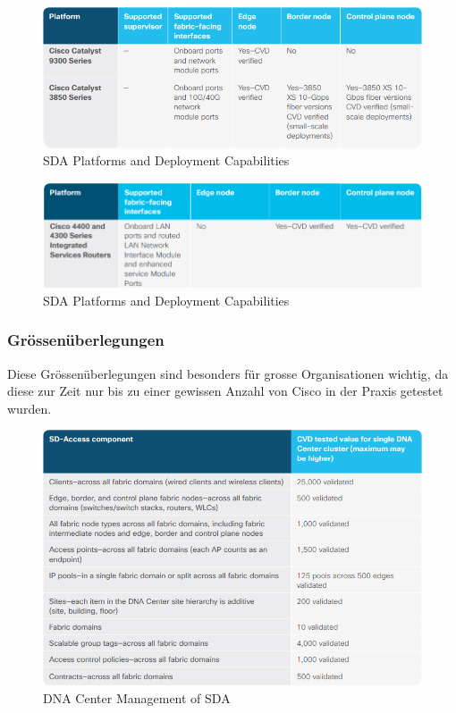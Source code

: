 \begin{figure}[H]
	\centering
	\includegraphics[width=0.8\linewidth]{img/Analyse/CVD-SDAswitchingplatformsanddeploymentcapabilities-1-2-5}
	\caption{SDA Platforms and Deployment Capabilities \cite{sda-designguide-sept2018}}
	\label{fig:SDA switching platforms and deployment capabilities}
\end{figure}

\begin{figure}[H]
	\centering
	\includegraphics[width=0.8\linewidth]{img/Analyse/CVD-SDAroutingandwirelessplatformsanddeploymentcapabilities-1-2-5}
	\caption{SDA Platforms and Deployment Capabilities \cite{sda-designguide-sept2018}}
	\label{fig:SDA routing and wireless platforms and deployment capabilities}
\end{figure}

\subsubsection{Grössenüberlegungen}
Diese Grössenüberlegungen sind besonders für grosse Organisationen wichtig, da diese zur Zeit nur bis zu einer gewissen Anzahl von Cisco in der Praxis getestet wurden.


\begin{figure}[H]
	\centering
	\includegraphics[width=0.8\linewidth]{img/Analyse/CVD-DNACmanagementofSDA-1-2-5}
	\caption{DNA Center Management of SDA \cite{sda-designguide-sept2018}}
	\label{fig:DNA Center management of SDA}
\end{figure}


